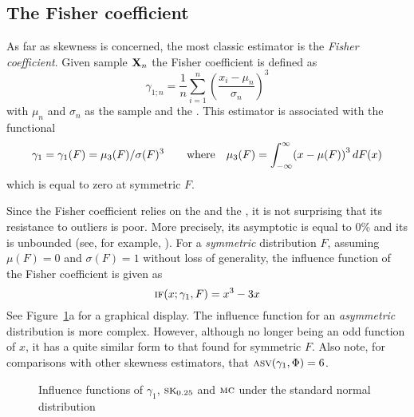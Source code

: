 \subsection{The Fisher coefficient}

As far as skewness is concerned, the most classic estimator is the \emph{Fisher
coefficient}. Given sample $\mathbf X_n$ the Fisher coefficient is defined as
\[
    \gamma_{1; n} = \frac{1}{n} \sum_{i=1}^n\left(\frac{x_i - \mu_n}{\sigma_n}\right)^{3}
\]
with $\mu_n$ and $\sigma_n$ as the sample  and the 
. This estimator is associated with the functional
\[
    \gamma_1 = \gamma_1(F) = \mu_{3}(F)/\sigma(F)^3
    \qquad\text{where}\quad
    \mu_{3}(F) = \int_{-\infty}^\infty \left(x-\mu(F)\right)^3 \dif F(x)
\]
which is equal to zero at symmetric $F$. 

Since the Fisher coefficient relies on the  and the , it is not surprising that its resistance to outliers is poor. More
precisely, its asymptotic  is equal to 0\% and its
 is unbounded (see, for example,
\citealp{groeneveld:1991}). For a \emph{symmetric} distribution $F$, assuming $\mu(F)
= 0$ and $\sigma(F) = 1$ without loss of generality, the influence function of  
the Fisher coefficient is given as
\[
    \stsc{IF}(x; \gamma_1, F) = x^{3} - 3x
\]
See Figure~\ref{fig:stat:IF_skew}a for a graphical display. The influence
function for an \emph{asymmetric} distribution is more complex. However,
although no longer being an odd function of $x$, it has a quite similar form to
that found for symmetric $F$. Also note, for comparisons with other skewness
estimators, that $\stsc{ASV}(\gamma_1, \Phi) = 6$.                            



\begin{figure}[h!]
    \centering
    \caption{Influence functions of $\gamma_1$, $\stsc{SK}_{0.25}$ and $\stsc{MC}$ under the standard normal distribution}
    \label{fig:stat:IF_skew}
\end{figure}

